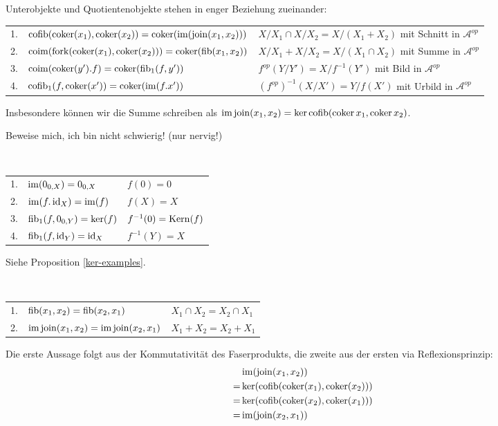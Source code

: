 \begin{prop}[Reflexionsprinzip]
Unterobjekte und Quotientenobjekte stehen in enger Beziehung zueinander:

\begin{tabular}{rll}
   1.
&  $\operatorname{cofib}(\operatorname{coker}(x_1), \operatorname{coker}(x_2)) = \operatorname{coker}(\operatorname{im}(\operatorname{join}(x_1,x_2)))$
&  $X/X_1 \cap X/X_2 = X/(X_1+X_2)$ mit Schnitt in $\mathcal A^{op}$
\\ 2.
&  $\operatorname{coim}(\operatorname{fork}(\operatorname{coker}(x_1),\operatorname{coker}(x_2))) = \operatorname{coker}(\operatorname{fib}(x_1,x_2))$
&  $X/X_1 + X/X_2 = X/(X_1\cap X_2)$ mit Summe in $\mathcal A^{op}$
\\ 3.
&  $\operatorname{coim}(\operatorname{coker}(y').f) = \operatorname{coker}(\operatorname{fib}_1(f,y'))$
&  $f^{op}(Y/Y') = X/f^{-1}(Y')$ mit Bild in $\mathcal A^{op}$
\\ 4.
&  $\operatorname{cofib}_1(f,\operatorname{coker}(x')) = \operatorname{coker}(\operatorname{im}(f.x'))$
&  $(f^{op})^{-1}(X/X') = Y/f(X')$ mit Urbild in $\mathcal A^{op}$
\end{tabular}
Insbesondere können wir die Summe schreiben als $\operatorname{im}\operatorname{join}(x_1,x_2)
= \ker\operatorname{cofib}(\operatorname{coker} x_1,\operatorname{coker} x_2)$.
\end{prop}
\begin{bew}
Beweise mich, ich bin nicht schwierig! (nur nervig!)
\end{bew}

\begin{lemm}[Regel (a)]
\ \linebreak

\begin{tabular}{rll}
   1.
&  $\operatorname{im}(0_{0,X}) = 0_{0,X}$
&  $f(0) = 0$
\\ 2.
&  $\operatorname{im}(f.\operatorname{id}_X) = \operatorname{im}(f)$
&  $f(X) = X$
\\ 3.
&  $\operatorname{fib}_1(f,0_{0,Y}) = \ker(f)$
&  $f^{-1}(0) = \operatorname{Kern}(f)$
\\ 4.
&  $\operatorname{fib}_1(f,\operatorname{id}_Y) = \operatorname{id}_X$
&  $f^{-1}(Y) = X$
\end{tabular}
\end{lemm}
\begin{bew}
Siehe Proposition \ref{ker-examples}.
\end{bew}

\begin{lemm}[Regel (b)]
\ \linebreak

\begin{tabular}{rll}
   1.
&  $\operatorname{fib}(x_1,x_2) = \operatorname{fib}(x_2,x_1)$  
&  $X_1 \cap X_2 = X_2 \cap X_1$
\\ 2.
&  $\operatorname{im}\operatorname{join}(x_1,x_2) = \operatorname{im}\operatorname{join}(x_2,x_1)$
&  $X_1 + X_2 = X_2 + X_1$
\end{tabular}
\end{lemm}
\begin{bew}
Die erste Aussage folgt aus der Kommutativität des Faserprodukts, die zweite aus der ersten via Reflexionsprinzip:
\begin{align*}
   & \operatorname{im}(\operatorname{join}(x_1,x_2))
\\=& \ker(\operatorname{cofib}(\operatorname{coker}(x_1),\operatorname{coker}(x_2)))
\\=& \ker(\operatorname{cofib}(\operatorname{coker}(x_2),\operatorname{coker}(x_1)))
\\=& \operatorname{im}(\operatorname{join}(x_2,x_1))
\end{align*}
\end{bew}


